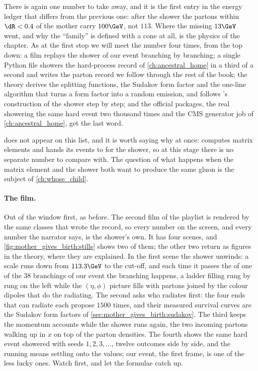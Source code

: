 There is again one number to take away, and it is the first entry in the
energy ledger that differs from the previous one: after the shower the
partons within $\dR<0.4$ of the mother carry $100\GeV$, not $113$. Where the
missing $13\GeV$ went, and why the ``family'' is defined with a cone at all,
is the physics of the chapter. As at the first stop we will meet the number
four times, from the top down: a film replays the shower of our event
branching by branching; a single Python file showers the hard-process record
of \cref{ch:ancestral_home} in a third of a second and writes the parton
record we follow through the rest of the book; the theory derives the
splitting functions, the Sudakov form factor and the one-line algorithm that
turns a form factor into a random emission, and follows \PYTHIA's
construction of the shower step by step; and the official packages, the real
\PYTHIA showering the same hard event two thousand times and the CMS
generator job of \cref{ch:ancestral_home}, get the last word.

\MG does not appear on this list, and it is worth saying why at once: \MG
computes matrix elements and hands its events to \PYTHIA for the shower, so
at this stage there is no separate \MG number to compare with. The question of what
happens when the matrix element and the shower both want to produce the
same gluon is the subject of \cref{ch:whose_child}.

\paragraph{The film.}
\label{sec:mother_gives_birth:animation}
Out of the window first, as before. The second film of the \jitjetworld
playlist is rendered by the same classes that wrote the record, so every
number on the screen, and every number the narrator says, is the shower's
own. It has four scenes, and \cref{fig:mother_gives_birth:stills} shows two
of them; the other two return as figures in the theory, where they are
explained. In the first scene the shower unwinds: a scale runs down from
$113.3\GeV$ to the cut-off, and each time it passes the \pt of one of the
$38$ branchings of our event the branching happens, a ladder filling rung by
rung on the left while the $(\eta,\phi)$ picture fills with partons joined by
the colour dipoles that do the radiating. The second asks who radiates
first: the four ends that can radiate each propose $1500$ times, and their
measured survival curves are the Sudakov form factors of
\cref{sec:mother_gives_birth:sudakov}. The third keeps the momentum accounts
while the shower runs again, the two incoming partons walking up in $x$ on
top of the parton densities. The fourth shows the same hard event showered
with seeds $1,2,3,\ldots$, twelve outcomes side by side, and the running
means settling onto the \PYTHIA values; our event, the first frame, is one
of the less lucky ones. Watch first, and let the formulae catch up.

